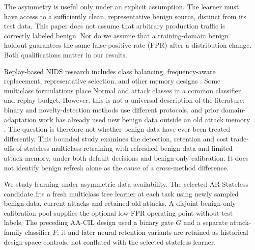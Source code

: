 \documentclass[10pt,twocolumn]{article}
\begin{document}
The asymmetry is useful only under an explicit assumption. The learner must have access to a sufficiently clean, representative benign source, distinct from its test data. This paper does not assume that arbitrary production traffic is correctly labeled benign. Nor do we assume that a training-domain benign holdout guarantees the same false-positive rate (FPR) after a distribution change. Both qualifications matter in our results.

Replay-based NIDS research includes class balancing, frequency-aware replacement, representative selection, and other memory designs \citep{cbrs,ecbrs,ssf,acil}. Some multiclass formulations place Normal and attack classes in a common classifier and replay budget. However, this is not a universal description of the literature: binary and novelty-detection methods use different protocols, and prior domain-adaptation work has already used new benign data outside an old attack memory \citep{cerasuolo_rtsi}. The question is therefore not whether benign data have ever been treated differently. This bounded study examines the detection, retention and cost trade-offs of stateless multiclass retraining with refreshed benign data and limited attack memory, under both default decisions and benign-only calibration. It does not identify benign refresh alone as the cause of a cross-method difference.

We study learning under asymmetric data availability. The selected AR-Stateless candidate fits a fresh multiclass tree learner at each task using newly sampled benign data, current attacks and retained old attacks. A disjoint benign-only calibration pool supplies the optional low-FPR operating point without test labels. The preceding AA-CIL design used a binary gate $G$ and a separate attack-family classifier $F$; it and later neural retention variants are retained as historical design-space controls, not conflated with the selected stateless learner.
\end{document}
